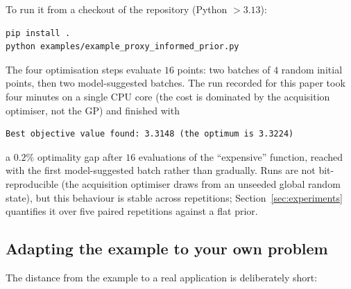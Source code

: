 \documentclass[11pt,a4paper]{article}
\begin{document}
To run it from a checkout of the repository (Python $> 3.13$):

\begin{lstlisting}[language=bash]
pip install .
python examples/example_proxy_informed_prior.py
\end{lstlisting}

The four optimisation steps evaluate $16$ points: two batches of $4$ random
initial points, then two model-suggested batches. The run recorded for this
paper took four minutes on a single CPU core (the cost is dominated by the
acquisition optimiser, not the GP) and finished with

\begin{lstlisting}[language={}]
Best objective value found: 3.3148 (the optimum is 3.3224)
\end{lstlisting}

\noindent a $0.2\%$ optimality gap after $16$ evaluations of the
``expensive'' function, reached with the first model-suggested batch rather
than gradually. Runs are not bit-reproducible (the acquisition optimiser
draws from an unseeded global random state), but this behaviour is stable
across repetitions; Section~\ref{sec:experiments} quantifies it over five
paired repetitions against a flat prior.

\subsection{Adapting the example to your own problem}

The distance from the example to a real application is deliberately short:
\end{document}
